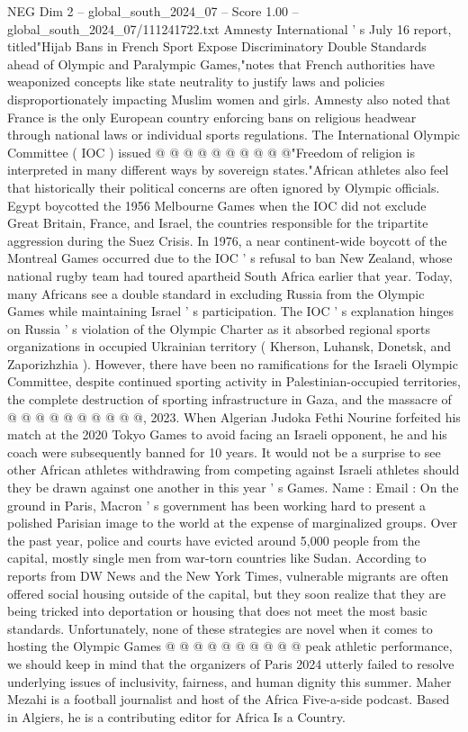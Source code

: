 \begin{textsample}{NEG Dim 2 – global\_south\_2024\_07 – Score 1.00 – global\_south\_2024\_07/111241722.txt}
Amnesty International ' s July 16 report, titled"Hijab Bans in French Sport Expose Discriminatory Double Standards ahead of Olympic and Paralympic Games,"notes that French authorities have weaponized concepts like state neutrality to justify laws and policies disproportionately impacting Muslim women and girls.
Amnesty also noted that France is the only European country enforcing bans on religious headwear through national laws or individual sports regulations.
The International Olympic Committee ( IOC ) issued @ @ @ @ @ @ @ @ @ @"Freedom of religion is interpreted in many different ways by sovereign states."African athletes also feel that historically their political concerns are often ignored by Olympic officials.
Egypt boycotted the 1956 Melbourne Games when the IOC did not exclude Great Britain, France, and Israel, the countries responsible for the tripartite aggression during the Suez Crisis.
In 1976, a near continent-wide boycott of the Montreal Games occurred due to the IOC ' s refusal to ban New Zealand, whose national rugby team had toured apartheid South Africa earlier that year.
Today, many Africans see a double standard in excluding Russia from the Olympic Games while maintaining Israel ' s participation.
The IOC ' s explanation hinges on Russia ' s violation of the Olympic Charter as it absorbed regional sports organizations in occupied Ukrainian territory ( Kherson, Luhansk, Donetsk, and Zaporizhzhia ).
However, there have been no ramifications for the Israeli Olympic Committee, despite continued sporting activity in Palestinian-occupied territories, the complete destruction of sporting infrastructure in Gaza, and the massacre of @ @ @ @ @ @ @ @ @ @, 2023.
When Algerian Judoka Fethi Nourine forfeited his match at the 2020 Tokyo Games to avoid facing an Israeli opponent, he and his coach were subsequently banned for 10 years.
It would not be a surprise to see other African athletes withdrawing from competing against Israeli athletes should they be drawn against one another in this year ' s Games.
Name : Email : On the ground in Paris, Macron ' s government has been working hard to present a polished Parisian image to the world at the expense of marginalized groups.
Over the past year, police and courts have evicted around 5,000 people from the capital, mostly single men from war-torn countries like Sudan.
According to reports from DW News and the New York Times, vulnerable migrants are often offered social housing outside of the capital, but they soon realize that they are being tricked into deportation or housing that does not meet the most basic standards.
Unfortunately, none of these strategies are novel when it comes to hosting the Olympic Games @ @ @ @ @ @ @ @ @ @ peak athletic performance, we should keep in mind that the organizers of Paris 2024 utterly failed to resolve underlying issues of inclusivity, fairness, and human dignity this summer.
Maher Mezahi is a football journalist and host of the Africa Five-a-side podcast.
Based in Algiers, he is a contributing editor for Africa Is a Country.

\end{textsample}
